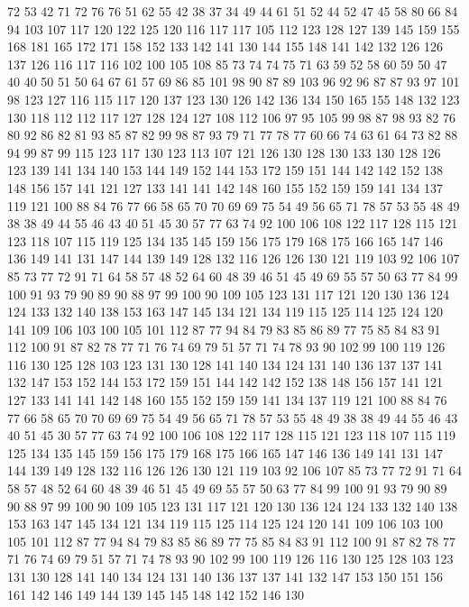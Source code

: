 72 53 42 71 72 76 76 51 62 55 42 38 37 34 49 44 61 51 52 44
52 47 45 58 80 66 84 94 103 107 117 120 122 125 120 116 117 117 105 112
123 128 127 139 145 159 155 168 181 165 172 171 158 152 133 142 141 130 144 155
148 141 142 132 126 126 137 126 116 117 116 102 100 105 108 85 73 74 74 75
71 63 59 52 58 60 59 50 47 40 40 50 51 50 64 67 61 57 69 86
85 101 98 90 87 89 103 96 92 96 87 87 93 97 101 98 123 127 116 115
117 120 137 123 130 126 142 136 134 150 165 155 148 132 123 130 118 112 112 117
127 128 124 127 108 112 106 97 95 105 99 98 87 98 93 82 76 80 92 86
82 81 93 85 87 82 99 98 87 93 79 71 77 78 77 60 66 74 63 61
64 73 82 88 94 99 87 99 115 123 117 130 123 113 107 121 126 130 128 130
133 130 128 126 123 139 141 134 140 153 144 149 152 144 153 172 159 151 144 142
142 152 138 148 156 157 141 121 127 133 141 141 142 148 160 155 152 159 159 141
134 137 119 121 100 88 84 76 77 66 58 65 70 70 69 69 75 54 49 56
65 71 78 57 53 55 48 49 38 38 49 44 55 46 43 40 51 45 30 57
77 63 74 92 100 106 108 122 117 128 115 121 123 118 107 115 119 125 134 135
145 159 156 175 179 168 175 166 165 147 146 136 149 141 131 147 144 139 149 128
132 116 126 126 130 121 119 103 92 106 107 85 73 77 72 91 71 64 58 57
48 52 64 60 48 39 46 51 45 49 69 55 57 50 63 77 84 99 100 91
93 79 90 89 90 88 97 99 100 90 109 105 123 131 117 121 120 130 136 124
124 133 132 140 138 153 163 147 145 134 121 134 119 115 125 114 125 124 120 141
109 106 103 100 105 101 112 87 77 94 84 79 83 85 86 89 77 75 85 84
83 91 112 100 91 87 82 78 77 71 76 74 69 79 51 57 71 74 78 93
90 102 99 100 119 126 116 130 125 128 103 123 131 130 128 141 140 134 124 131
140 136 137 137 141 132 147 153 152 144 153 172 159 151 144 142 142 152 138 148
156 157 141 121 127 133 141 141 142 148 160 155 152 159 159 141 134 137 119 121
100 88 84 76 77 66 58 65 70 70 69 69 75 54 49 56 65 71 78 57
53 55 48 49 38 38 49 44 55 46 43 40 51 45 30 57 77 63 74 92
100 106 108 122 117 128 115 121 123 118 107 115 119 125 134 135 145 159 156 175
179 168 175 166 165 147 146 136 149 141 131 147 144 139 149 128 132 116 126 126
130 121 119 103 92 106 107 85 73 77 72 91 71 64 58 57 48 52 64 60
48 39 46 51 45 49 69 55 57 50 63 77 84 99 100 91 93 79 90 89
90 88 97 99 100 90 109 105 123 131 117 121 120 130 136 124 124 133 132 140
138 153 163 147 145 134 121 134 119 115 125 114 125 124 120 141 109 106 103 100
105 101 112 87 77 94 84 79 83 85 86 89 77 75 85 84 83 91 112 100
91 87 82 78 77 71 76 74 69 79 51 57 71 74 78 93 90 102 99 100
119 126 116 130 125 128 103 123 131 130 128 141 140 134 124 131 140 136 137 137
141 132 147 153 150 151 156 161 142 146 149 144 139 145 145 148 142 152 146 130
